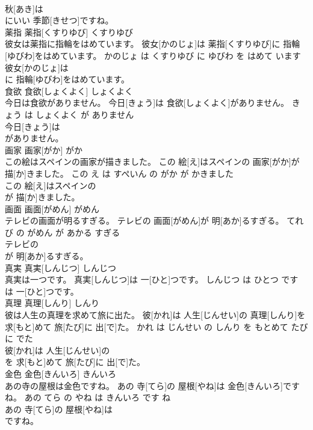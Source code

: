 \documentclass[8pt]{extreport}
\begin{document}
\begin{CJK}{UTF8}{min}
\\	秋[あき]は
\\	にいい 季節[きせつ]ですね。			
\\	薬指	薬指[くすりゆび]	くすりゆび	
\\	彼女は薬指に指輪をはめています。	彼女[かのじょ]は 薬指[くすりゆび]に 指輪[ゆびわ]をはめています。	かのじょ は くすりゆび に ゆびわ を はめて います	
\\	彼女[かのじょ]は
\\	に 指輪[ゆびわ]をはめています。			
\\	食欲	食欲[しょくよく]	しょくよく	
\\	今日は食欲がありません。	今日[きょう]は 食欲[しょくよく]がありません。	きょう は しょくよく が ありません	
\\	今日[きょう]は
\\	がありません。			
\\	画家	画家[がか]	がか	
\\	この絵はスペインの画家が描きました。	この 絵[え]はスペインの 画家[がか]が 描[か]きました。	この え は すぺいん の がか が かきました	
\\	この 絵[え]はスペインの
\\	が 描[か]きました。			
\\	画面	画面[がめん]	がめん	
\\	テレビの画面が明るすぎる。	テレビの 画面[がめん]が 明[あか]るすぎる。	てれび の がめん が あかる すぎる	
\\	テレビの
\\	が 明[あか]るすぎる。			
\\	真実	真実[しんじつ]	しんじつ	
\\	真実は一つです。	真実[しんじつ]は 一[ひと]つです。	しんじつ は ひとつ です	
\\	は 一[ひと]つです。			
\\	真理	真理[しんり]	しんり	
\\	彼は人生の真理を求めて旅に出た。	彼[かれ]は 人生[じんせい]の 真理[しんり]を 求[もと]めて 旅[たび]に 出[で]た。	かれ は じんせい の しんり を もとめて たび に でた	
\\	彼[かれ]は 人生[じんせい]の
\\	を 求[もと]めて 旅[たび]に 出[で]た。			
\\	金色	金色[きんいろ]	きんいろ	
\\	あの寺の屋根は金色ですね。	あの 寺[てら]の 屋根[やね]は 金色[きんいろ]ですね。	あの てら の やね は きんいろ です ね	
\\	あの 寺[てら]の 屋根[やね]は
\\	ですね。			

\end{CJK}
\end{document}
